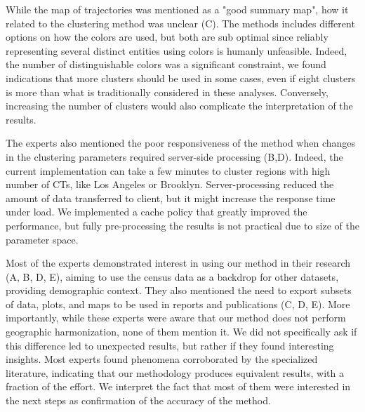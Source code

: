 While the map of trajectories was mentioned as a "good summary map", how it
related to the clustering method was unclear (C). The methods includes different
options on how the colors are used, but both are sub optimal since reliably
representing several distinct entities using colors is humanly unfeasible.
Indeed, the number of distinguishable colors was a significant constraint, we
found indications that more clusters should be used in some cases, even if eight
clusters is more than what is traditionally considered in these analyses.
Conversely, increasing the number of clusters would also complicate the
interpretation of the results.


The experts also mentioned the poor responsiveness of the method when changes in
the clustering parameters required server-side processing (B,D). Indeed, the
current implementation can take a few minutes to cluster regions with high
number of CTs, like Los Angeles or Brooklyn. Server-processing reduced the
amount of data transferred to client, but it might increase the response time
under load. We implemented a cache policy that greatly improved the performance,
but fully pre-processing the results is not practical due to size of the
parameter space.

Most of the experts demonstrated interest in using our method in their research
(A, B, D, E), aiming to use the census data as a backdrop for other datasets,
providing demographic context. They also mentioned the need to export subsets of
data, plots, and maps to be used in reports and publications (C, D, E). More
importantly, while these experts were aware that our method does not perform
geographic harmonization, none of them mention it. We did not specifically ask
if this difference led to unexpected results, but rather if they found
interesting insights. Most experts found phenomena corroborated by the
specialized literature, indicating that our methodology produces equivalent
results, with a fraction of the effort. We interpret the fact that most of them
were interested in the next steps as confirmation of the accuracy of the method.